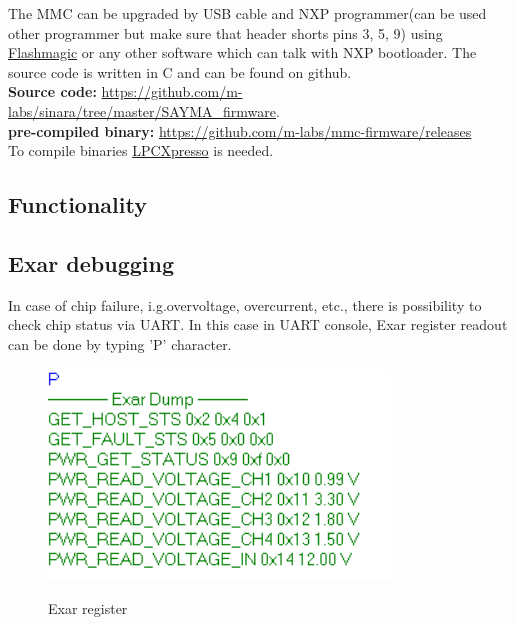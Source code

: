 The MMC can be upgraded by USB cable and NXP programmer(can be used other programmer but make sure that header shorts pins 3, 5, 9) using  \href{http://www.flashmagictool.com/}{Flashmagic} or any other software which can talk with NXP bootloader. The source code is written in C and can be found on github.\\ 
\textbf{Source code:} \href{https://github.com/m-labs/sinara/tree/master/SAYMA\_firmware}{https://github.com/m-labs/sinara/tree/master/SAYMA\_firmware}.\\
\textbf{pre-compiled binary:} \href{https://github.com/m-labs/mmc-firmware/releases}{https://github.com/m-labs/mmc-firmware/releases}\\

To compile binaries \href{https://www.nxp.com/products/processors-and-microcontrollers/arm-based-processors-and-mcus/lpc-cortex-m-mcus/lpc1100-cortex-m0-plus-m0/lpcxpresso-ide-v8.2.2:LPCXPRESSO?tab=Design_Tools_Tab}{LPCXpresso} is needed.

\subsection{Functionality}


\subsection{Exar debugging}
 
In case of chip failure, i.g.overvoltage, overcurrent, etc., there is possibility  to check chip status via UART. In this case in UART console, Exar register readout can be done by typing 'P' character.\\

	\begin{figure}[htbp!]
		\centering
		\includegraphics[scale=0.6]{img/exarreg.png}\\
		\caption{Exar register } 
	\end{figure}	
\clearpage
